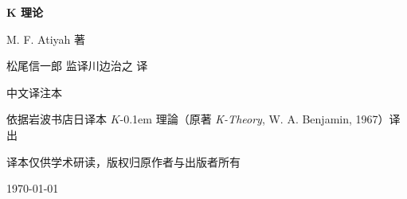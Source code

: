 \begin{titlepage}
\centering
\vspace*{3cm}
{\Huge\bfseries K 理论\par}
\vspace{1.2cm}
{\Large M. F. Atiyah 著\par}
\vspace{0.4cm}
{\large 松尾信一郎 监译\qquad 川边治之 译\par}
\vspace{0.6cm}
{\large 中文译注本\par}
\vspace{2.2cm}
{\large 依据岩波书店日译本 $K$\kern-0.1em 理論（原著 \textit{K-Theory}, W. A. Benjamin, 1967）译出\par}
\vspace{1cm}
{\small 译本仅供学术研读，版权归原作者与出版者所有\par}
\vfill
{\small \today\par}
\end{titlepage}
